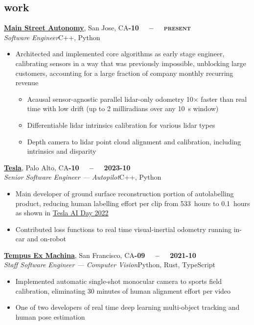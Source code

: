 \documentclass[margin,10pt]{res}
\begin{document}
\begin{resume}
\section{\sc \lsstyle work}
    \href{https://mainstreetautonomy.com}{\textbf{Main Street Autonomy}}, San Jose, CA\hfill \textsc{\bfseries{}-10~~ -- ~~present}\\
    \textit{Software Engineer}\hfill C++, Python
    \vspace{0.5em}
    \begin{itemize}
        \item Architected and implemented core algorithms as early stage engineer, calibrating sensors in a way that was previously impossible, unblocking large customers, accounting for a large fraction of company monthly recurring revenue
        \begin{itemize}
        \item Acausal sensor-agnostic parallel lidar-only odometry 10$\times$ faster than real time with low drift (up to 2 milliradians over any 10~s window)
        \item Differentiable lidar intrinsics calibration for various lidar types
        \item Depth camera to lidar point cloud alignment and calibration, including intrinsics and disparity
        \end{itemize}
    \end{itemize}
    
    \href{https://tesla.com/ai}{\textbf{Tesla}}, Palo Alto, CA\hfill \textsc{\bfseries{}-10~~ -- ~~2023-10}\\
    \textit{Senior Software Engineer --- Autopilot}\hfill C++, Python
    \vspace{0.5em}
    \begin{itemize}
        \item Main developer of ground surface reconstruction portion of autolabelling product, reducing human labelling effort per clip from 533~hours to 0.1~hours as shown in \href{https://youtu.be/ODSJsviD_SU?t=6034}{Tesla AI Day 2022}
        \item Contributed loss functions to real time visual-inertial odometry running in-car and on-robot
    \end{itemize}

    \href{https://tempus-ex.com}{\textbf{Tempus Ex Machina}}, San Francisco, CA\hfill \textsc{\bfseries{}-09~~ -- ~~2021-10}\\
    \textit{Staff Software Engineer --- Computer Vision}\hfill Python, Rust, TypeScript
    \vspace{0.5em}
    \begin{itemize}
        \item Implemented automatic single-shot monocular camera to sports field calibration, eliminating 30 minutes of human alignment effort per video
        \item One of two developers of real time deep learning multi-object tracking and human pose estimation
    \end{itemize}


\end{resume}
\end{document}
